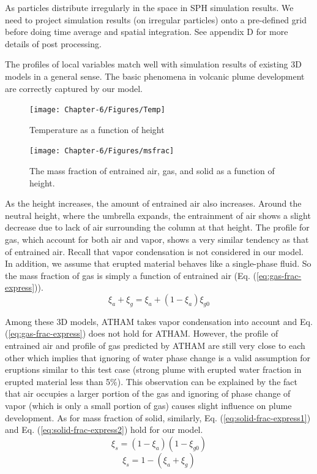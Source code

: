 As particles distribute irregularly in the space in SPH simulation results. We need to project simulation results (on irregular particles) onto a pre-defined grid before doing time average and spatial integration. See appendix D for more details of post processing.

The profiles of local variables match well with simulation results of existing 3D models in a general sense. The basic phenomena in volcanic plume development are correctly captured by our model.

\begin{figure}
\center
\texttt{[image: Chapter-6/Figures/Temp]}
\caption{Temperature as a function of height}
\label{fig:strong_local_temp}
\end{figure}

\begin{figure}
\texttt{[image: Chapter-6/Figures/msfrac]}
\caption{The mass fraction of entrained air, gas, and solid as a function of height.}
\label{fig:strong_plume_mass_fraction}
\end{figure}

As the height increases, the amount of entrained air also increases. Around the neutral height, where the umbrella expands, the entrainment of air shows a slight decrease due to lack of air surrounding the column at that height. The profile for gas, which account for both air and vapor, shows a very similar tendency as that of entrained air. Recall that vapor condensation is not considered in our model. In addition, we assume that erupted material behaves like a single-phase fluid. So the mass fraction of gas is simply a function of entrained air (Eq. (\ref{eq:gas-frac-express})).
\begin{equation}
\xi_a + \xi_g = \xi_a + \left(1-\xi_a\right) \xi_{g0}
\label{eq:gas-frac-express}
\end{equation}
 
Among these 3D models, ATHAM takes vapor condensation into account and Eq. (\ref{eq:gas-frac-express}) does not hold for ATHAM. However, the profile of entrained air and profile of gas predicted by ATHAM are still very close to each other which implies that ignoring of water phase change is a valid assumption for eruptions similar to this test case (strong plume with erupted water fraction in erupted material less than 5\%). This observation can be explained by the fact that air occupies a larger portion of the gas and ignoring of phase change of vapor (which is only a small portion of gas) causes slight influence on plume development. As for mass fraction of solid, similarly, Eq. (\ref{eq:solid-frac-express1}) and Eq. (\ref{eq:solid-frac-express2}) hold for our model. 
\begin{equation}
\xi_s = \left(1 - \xi_a\right) \left(1- \xi_{g0}\right)
\label{eq:solid-frac-express1}
\end{equation}
\begin{equation}
\xi_s = 1 - \left(\xi_a + \xi_g\right)
\label{eq:solid-frac-express2}
\end{equation}

